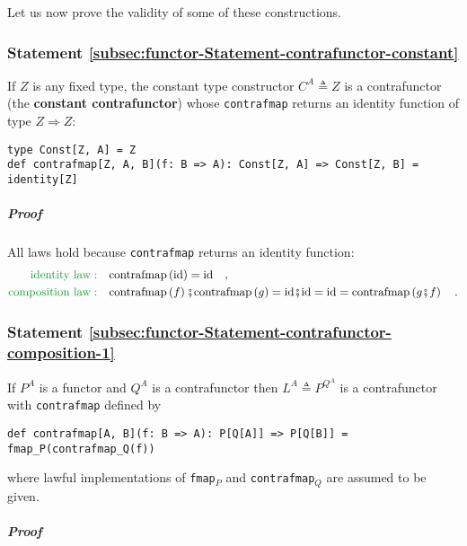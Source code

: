 Let us now prove the validity of some of these constructions.

\subsubsection{Statement \label{subsec:functor-Statement-contrafunctor-constant}\ref{subsec:functor-Statement-contrafunctor-constant}}

If $Z$ is any fixed type, the constant type constructor $C^{A}\triangleq Z$
is a contrafunctor (the \textbf{constant contrafunctor})
whose \lstinline!contrafmap! returns an identity function of type
$Z\Rightarrow Z$:
\begin{lstlisting}
type Const[Z, A] = Z
def contrafmap[Z, A, B](f: B => A): Const[Z, A] => Const[Z, B] = identity[Z] 
\end{lstlisting}


\subparagraph{Proof}

All laws hold because \lstinline!contrafmap! returns an identity
function:
\begin{align*}
{\color{greenunder}\text{identity law}:}\quad & \text{contrafmap}\left(\text{id}\right)=\text{id}\quad,\\
{\color{greenunder}\text{composition law}:}\quad & \text{contrafmap}\left(f\right)\bef\text{contrafmap}\left(g\right)=\text{id}\bef\text{id}=\text{id}=\text{contrafmap}\left(g\bef f\right)\quad.
\end{align*}


\subsubsection{Statement \label{subsec:functor-Statement-contrafunctor-composition-1}\ref{subsec:functor-Statement-contrafunctor-composition-1}}

If $P^{A}$ is a functor and $Q^{A}$ is a contrafunctor then $L^{A}\triangleq P^{Q^{A}}$
is a contrafunctor with \lstinline!contrafmap! defined by
\begin{lstlisting}
def contrafmap[A, B](f: B => A): P[Q[A]] => P[Q[B]] = fmap_P(contrafmap_Q(f))
\end{lstlisting}
where lawful implementations of \lstinline!fmap!$_{P}$ and \lstinline!contrafmap!$_{Q}$
are assumed to be given.

\subparagraph{Proof}

